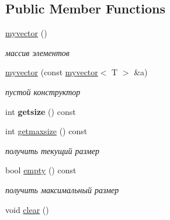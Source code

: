 \subsection*{Public Member Functions}
\begin{DoxyCompactItemize}
\item 
\hypertarget{classmyvector_a428edb74f0b841ab75089f9a088f91bb}{}\hyperlink{classmyvector_a428edb74f0b841ab75089f9a088f91bb}{myvector} ()\label{classmyvector_a428edb74f0b841ab75089f9a088f91bb}

\begin{DoxyCompactList}\small\item\em массив элементов \end{DoxyCompactList}\item 
\hypertarget{classmyvector_a511bd095ff5529ff2abde8a12dcfe114}{}\hyperlink{classmyvector_a511bd095ff5529ff2abde8a12dcfe114}{myvector} (const \hyperlink{classmyvector}{myvector}$<$ T $>$ \&a)\label{classmyvector_a511bd095ff5529ff2abde8a12dcfe114}

\begin{DoxyCompactList}\small\item\em пустой конструктор \end{DoxyCompactList}\item 
\hypertarget{classmyvector_abcf2c7de881deb7bade5770fbe21793b}{}int {\bfseries getsize} () const \label{classmyvector_abcf2c7de881deb7bade5770fbe21793b}

\item 
\hypertarget{classmyvector_ae0df772149c6993c090e6b6ec192a82d}{}int \hyperlink{classmyvector_ae0df772149c6993c090e6b6ec192a82d}{getmaxsize} () const \label{classmyvector_ae0df772149c6993c090e6b6ec192a82d}

\begin{DoxyCompactList}\small\item\em получить текущий размер \end{DoxyCompactList}\item 
\hypertarget{classmyvector_acc02daf3e29ac91a81e7267a11834b14}{}bool \hyperlink{classmyvector_acc02daf3e29ac91a81e7267a11834b14}{empty} () const \label{classmyvector_acc02daf3e29ac91a81e7267a11834b14}

\begin{DoxyCompactList}\small\item\em получить максимальный размер \end{DoxyCompactList}\item 
\hypertarget{classmyvector_a0ae32240d94c831fb56259b33ff918fe}{}void \hyperlink{classmyvector_a0ae32240d94c831fb56259b33ff918fe}{clear} ()\label{classmyvector_a0ae32240d94c831fb56259b33ff918fe}


\end{DoxyCompactItemize}
